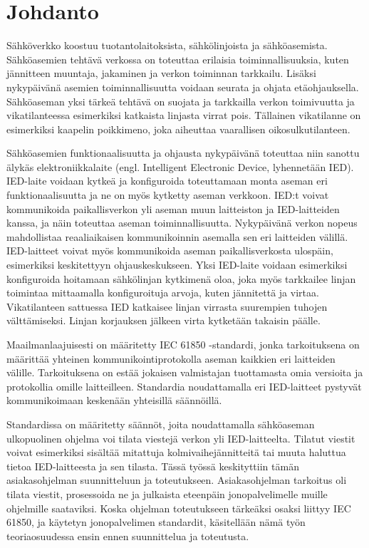 \chapter{Johdanto}
\label{ch:johdanto}
Sähköverkko koostuu tuotantolaitoksista, sähkölinjoista ja sähköasemista. Sähköasemien tehtävä verkossa on toteuttaa erilaisia toiminnallisuuksia, kuten jännitteen muuntaja, jakaminen ja verkon toiminnan tarkkailu. Lisäksi nykypäivänä asemien toiminnallisuutta voidaan seurata ja ohjata etäohjauksella. Sähköaseman yksi tärkeä tehtävä on suojata ja tarkkailla verkon toimivuutta ja vikatilanteessa esimerkiksi katkaista linjasta virrat pois. Tällainen vikatilanne on esimerkiksi kaapelin poikkimeno, joka aiheuttaa vaarallisen oikosulkutilanteen.

Sähköasemien funktionaalisuutta ja ohjausta nykypäivänä toteuttaa niin sanottu älykäs elektroniikkalaite (engl. Intelligent Electronic Device, lyhennetään IED). IED-laite voidaan kytkeä ja konfiguroida toteuttamaan monta aseman eri funktionaalisuutta ja ne on myös kytketty aseman verkkoon. IED:t voivat kommunikoida paikallisverkon yli aseman muun laitteiston ja IED-laitteiden kanssa, ja näin toteuttaa aseman toiminnallisuutta. Nykypäivänä verkon nopeus mahdollistaa reaaliaikaisen kommunikoinnin asemalla sen eri laitteiden välillä. IED-laitteet voivat myös kommunikoida aseman paikallisverkosta ulospäin, esimerkiksi keskitettyyn ohjauskeskukseen. Yksi IED-laite voidaan esimerkiksi konfiguroida hoitamaan sähkölinjan kytkimenä oloa, joka myös tarkkailee linjan toimintaa mittaamalla konfiguroituja arvoja, kuten jännitettä ja virtaa. Vikatilanteen sattuessa IED katkaisee linjan virrasta suurempien tuhojen välttämiseksi. Linjan korjauksen jälkeen virta kytketään takaisin päälle.

Maailmanlaajuisesti on määritetty IEC 61850 -standardi, jonka tarkoituksena on määrittää yhteinen kommunikointiprotokolla aseman kaikkien eri laitteiden välille. Tarkoituksena on estää jokaisen valmistajan tuottamasta omia versioita ja protokollia omille laitteilleen. Standardia noudattamalla eri IED-laitteet pystyvät kommunikoimaan keskenään yhteisillä säännöillä.

Standardissa on määritetty säännöt, joita noudattamalla sähköaseman ulkopuolinen ohjelma voi tilata viestejä verkon yli IED-laitteelta. Tilatut viestit voivat esimerkiksi sisältää mitattuja kolmivaihejännitteitä tai muuta haluttua tietoa IED-laitteesta ja sen tilasta. Tässä työssä keskityttiin tämän asiakasohjelman suunnitteluun ja toteutukseen. Asiakasohjelman tarkoitus oli tilata viestit, prosessoida ne ja julkaista eteenpäin jonopalvelimelle muille ohjelmille saataviksi. Koska ohjelman toteutukseen tärkeäksi osaksi liittyy IEC 61850, ja käytetyn jonopalvelimen standardit, käsitellään nämä työn teoriaosuudessa ensin ennen suunnittelua ja toteutusta.

